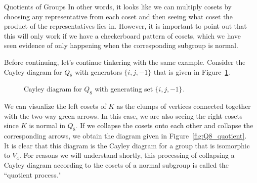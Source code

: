 \begin{section}{Quotients of Groups}
In other words, it looks like we can multiply cosets by choosing any representative from each coset and then seeing what coset the product of the representatives lies in.  However, it is important to point out that this will only work if we have a checkerboard pattern of cosets, which we have seen evidence of only happening when the corresponding subgroup is normal.

Before continuing, let's continue tinkering with the same example.  Consider the Cayley diagram for $Q_8$ with generators $\{i,j,-1\}$ that is given in Figure~\ref{fig:Q8_repeat}.

\begin{figure}[!ht]
\centering
{}
\caption{Cayley diagram for $Q_8$ with generating set $\{i,j,-1\}$.}
\label{fig:Q8_repeat}
\end{figure}
We can visualize the left cosets of $K$ as the clumps of vertices connected together with the two-way green arrows.  In this case, we are also seeing the right cosets since $K$ is normal in $Q_8$.  If we collapse the cosets onto each other and collapse the corresponding arrows, we obtain the diagram given in Figure~\ref{fig:Q8_quotient}. It is clear that this diagram is the Cayley diagram for a group that is isomorphic to $V_4$.  For reasons we will understand shortly, this processing of collapsing a Cayley diagram according to the cosets of a normal subgroup is called the ``quotient process."


\end{section}
